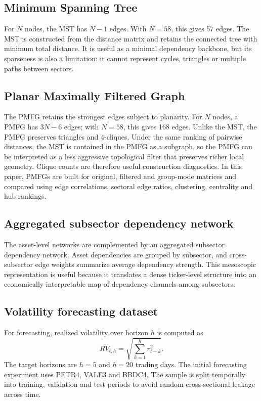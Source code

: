 \subsection{Minimum Spanning Tree}

For $N$ nodes, the MST has $N-1$ edges. With $N=58$, this gives 57 edges. The MST is constructed from the distance matrix and retains the connected tree with minimum total distance. It is useful as a minimal dependency backbone, but its sparseness is also a limitation: it cannot represent cycles, triangles or multiple paths between sectors.

\subsection{Planar Maximally Filtered Graph}

The PMFG retains the strongest edges subject to planarity. For $N$ nodes, a PMFG has $3N-6$ edges; with $N=58$, this gives 168 edges. Unlike the MST, the PMFG preserves triangles and 4-cliques. Under the same ranking of pairwise distances, the MST is contained in the PMFG as a subgraph, so the PMFG can be interpreted as a less aggressive topological filter that preserves richer local geometry. Clique counts are therefore useful construction diagnostics. In this paper, PMFGs are built for original, filtered and group-mode matrices and compared using edge correlations, sectoral edge ratios, clustering, centrality and hub rankings.

\subsection{Aggregated subsector dependency network}

The asset-level networks are complemented by an aggregated subsector dependency network. Asset dependencies are grouped by subsector, and cross-subsector edge weights summarize average dependency strength. This mesoscopic representation is useful because it translates a dense ticker-level structure into an economically interpretable map of dependency channels among subsectors.

\subsection{Volatility forecasting dataset}

For forecasting, realized volatility over horizon $h$ is computed as
\begin{equation}
RV_{t,h} = \sqrt{\sum_{k=1}^{h} r_{t+k}^2}.
\end{equation}
The target horizons are $h=5$ and $h=20$ trading days. The initial forecasting experiment uses PETR4, VALE3 and BBDC4. The sample is split temporally into training, validation and test periods to avoid random cross-sectional leakage across time.

